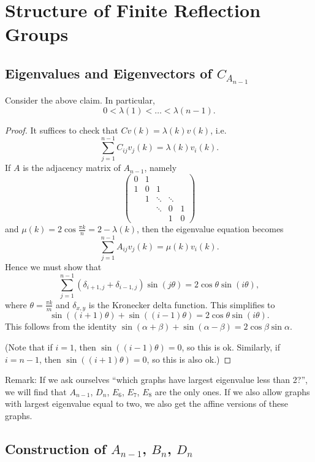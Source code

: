 \section{Structure of Finite Reflection Groups}

\subsection{Eigenvalues and Eigenvectors of $C_{A_{n-1}}$}

Consider the above claim. In particular,
\[
    0 < \lambda(1) < \dots < \lambda(n-1).
\]
\begin{proof}
It suffices to check that $C v(k) = \lambda(k) v(k)$, i.e.
\[
    \sum_{j=1}^{n-1} C_{ij} v_j(k) = \lambda(k) v_i(k).
\]
If $A$ is the adjacency matrix of $A_{n-1}$, namely
\[
    \begin{pmatrix}
        0 & 1 \\
        1 & 0 & 1 \\
          & 1 & \ddots & \ddots \\
          &   & \ddots & 0 & 1 \\
          &   &        & 1 & 0
    \end{pmatrix}
\]
and $\mu(k) = 2 \cos \frac{\pi k}{n} = 2 - \lambda(k)$, then the eigenvalue
equation becomes
\[
    \sum_{j=1}^{n-1} A_{ij} v_j(k) = \mu(k) v_i(k).
\]
Hence we must show that
\[
    \sum_{j=1}^{n-1} (\delta_{i+1,j} + \delta_{i-1,j}) \sin (j \theta)
    = 2 \cos \theta \sin (i \theta),
\]
where $\theta = \frac{\pi k}{m}$ and $\delta_{x,y}$ is the Kronecker delta function.
This simplifies to
\[
    \sin((i+1) \theta) + \sin ((i-1)\theta) = 2 \cos \theta \sin (i \theta).
\]
This follows from the identity $\sin (\alpha + \beta) + \sin (\alpha - \beta)
= 2 \cos \beta \sin \alpha$.

(Note that if $i=1$, then $\sin ((i-1) \theta) = 0$, so this is ok. Similarly,
if $i=n-1$, then $\sin((i+1) \theta) = 0$, so this is also ok.)
\end{proof}

Remark: If we ask ourselves ``which graphs have largest eigenvalue less than
2?'', we will find that $A_{n-1}$, $D_n$, $E_6$, $E_7$, $E_8$ are the only ones.
If we also allow graphs with largest eigenvalue equal to two, we also get the
affine versions of these graphs.

\newpage

\subsection{Construction of $A_{n-1}$, $B_n$, $D_n$}

